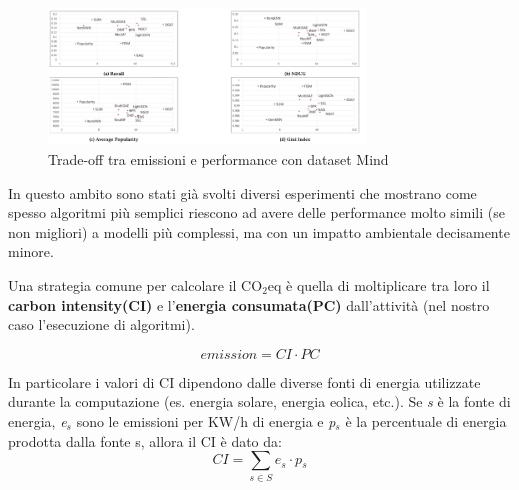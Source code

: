 
\begin{frame}{}
    \begin{figure}
    \centering
    \includegraphics[width=0.75\textwidth]{images/risultati-valutazione.png}
    \caption{Trade-off tra emissioni e performance con dataset Mind}
\end{figure}

In questo ambito sono stati già svolti diversi esperimenti che mostrano come spesso algoritmi più semplici riescono ad avere delle performance molto simili (se non migliori) a modelli più complessi, ma con un impatto ambientale decisamente minore.
\end{frame}

\begin{frame}{}
    Una strategia comune per calcolare il CO$_2$eq è quella di moltiplicare tra loro il \textbf{carbon intensity(CI)} e l'\textbf{energia consumata(PC)} dall'attività (nel nostro caso l'esecuzione di algoritmi).



    \begin{equation*}
        \textit{emission} = \textit{CI}  \cdot \textit{PC}
    \end{equation*}
    
    \noindent In particolare i valori di CI dipendono dalle diverse fonti di energia utilizzate durante la computazione 
    (es. energia solare, energia eolica, etc.). Se \textit{s} è la fonte di energia,  \textit{e$_s$} sono le emissioni per KW/h di energia e \textit{p$_s$}  è la percentuale di energia prodotta dalla fonte s, allora il CI è dato da:
    \begin{equation*}
        \textit{CI} = \sum_{s \in S} \textit{e$_s$} \cdot \textit{p$_s$}
    \end{equation*}
\end{frame}


